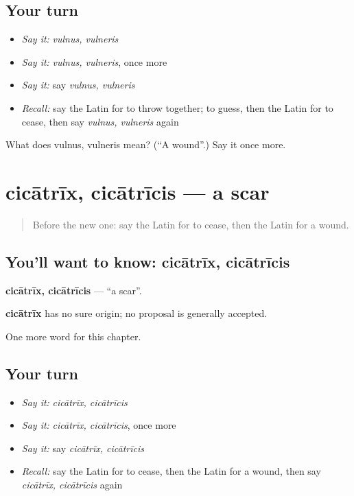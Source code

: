 \subsection*{Your turn}
\begin{itemize}
\raggedright
  \item \emph{Say it:} \emph{vulnus, vulneris}
  \item \emph{Say it:} \emph{vulnus, vulneris}, once more
  \item \emph{Say it:} say \emph{vulnus, vulneris}
  \item \emph{Recall:} say the Latin for to throw together; to guess, then the Latin for to cease, then say \emph{vulnus, vulneris} again
\end{itemize}

\begin{tcolorbox}[breakable,colback=teal!4,colframe=teal!35!black,title={Before you move on}]
What does vulnus, vulneris mean? (\textquotedblleft{}A wound\textquotedblright{}.) Say it once more.
\end{tcolorbox}
\section[cicātrīx, cicātrīcis]{cicātrīx, cicātrīcis — a scar}

\label{lesson:LA-C205-cicatrix}



\begin{quote}
Before the new one: say the Latin for to cease, then the Latin for a wound.
\end{quote}

\subsection*{You'll want to know: cicātrīx, cicātrīcis}
\textbf{cicātrīx, cicātrīcis} — \textquotedblleft{}a scar\textquotedblright{}.

\begin{cousinweb}
\textbf{cicātrīx} has no sure origin; no proposal is generally accepted.
\end{cousinweb}

\begin{grammarlens}[title={What you've built}]
One more word for this chapter.
\end{grammarlens}

\subsection*{Your turn}
\begin{itemize}
\raggedright
  \item \emph{Say it:} \emph{cicātrīx, cicātrīcis}
  \item \emph{Say it:} \emph{cicātrīx, cicātrīcis}, once more
  \item \emph{Say it:} say \emph{cicātrīx, cicātrīcis}
  \item \emph{Recall:} say the Latin for to cease, then the Latin for a wound, then say \emph{cicātrīx, cicātrīcis} again
\end{itemize}


